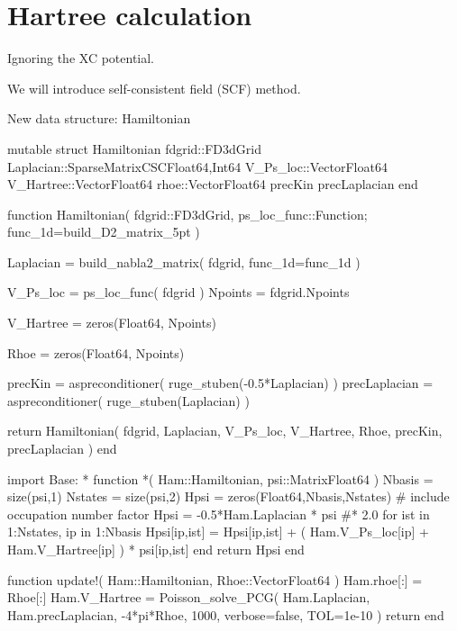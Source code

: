 \section{Hartree calculation}

Ignoring the XC potential.

We will introduce self-consistent field (SCF) method.

New data structure: Hamiltonian
\begin{juliacode}
mutable struct Hamiltonian
    fdgrid::FD3dGrid
    Laplacian::SparseMatrixCSC{Float64,Int64}
    V_Ps_loc::Vector{Float64}
    V_Hartree::Vector{Float64}
    rhoe::Vector{Float64}
    precKin
    precLaplacian
end
\end{juliacode}

\begin{juliacode}
function Hamiltonian( fdgrid::FD3dGrid, ps_loc_func::Function; func_1d=build_D2_matrix_5pt )
    
    Laplacian = build_nabla2_matrix( fdgrid, func_1d=func_1d )
    
    V_Ps_loc = ps_loc_func( fdgrid )
    Npoints = fdgrid.Npoints
    
    V_Hartree = zeros(Float64, Npoints)

    Rhoe = zeros(Float64, Npoints)

    precKin = aspreconditioner( ruge_stuben(-0.5*Laplacian) )
    precLaplacian = aspreconditioner( ruge_stuben(Laplacian) )
    
    return Hamiltonian( fdgrid, Laplacian, V_Ps_loc, V_Hartree, Rhoe, precKin, precLaplacian )
end
\end{juliacode}


\begin{juliacode}
import Base: *
function *( Ham::Hamiltonian, psi::Matrix{Float64} )
    Nbasis = size(psi,1)
    Nstates = size(psi,2)
    Hpsi = zeros(Float64,Nbasis,Nstates)
    # include occupation number factor
    Hpsi = -0.5*Ham.Laplacian * psi #* 2.0
    for ist in 1:Nstates, ip in 1:Nbasis
        Hpsi[ip,ist] = Hpsi[ip,ist] + ( Ham.V_Ps_loc[ip] + Ham.V_Hartree[ip] ) * psi[ip,ist]
    end
    return Hpsi
end
\end{juliacode}

\begin{juliacode}
function update!( Ham::Hamiltonian, Rhoe::Vector{Float64} )
    Ham.rhoe[:] = Rhoe[:]
    Ham.V_Hartree = Poisson_solve_PCG( Ham.Laplacian, Ham.precLaplacian, -4*pi*Rhoe, 1000, verbose=false, TOL=1e-10 )
    return
end
\end{juliacode}

